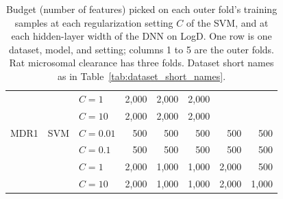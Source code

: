 \begin{table}[htbp]
\begin{tabular}{@{}lllrrrrr@{}}
 &  & $C = 1$ & 2{,}000 & 2{,}000 & 2{,}000 &  &  \\
 &  & $C = 10$ & 2{,}000 & 2{,}000 & 2{,}000 &  &  \\
MDR1 & SVM & $C = 0.01$ & 500 & 500 & 500 & 500 & 500 \\
 &  & $C = 0.1$ & 500 & 500 & 500 & 500 & 500 \\
 &  & $C = 1$ & 2{,}000 & 1{,}000 & 1{,}000 & 2{,}000 & 500 \\
 &  & $C = 10$ & 2{,}000 & 1{,}000 & 1{,}000 & 2{,}000 & 1{,}000 \\
\bottomrule
\end{tabular}
\caption[Budget picked at each setting of the SVM and the DNN.]{Budget (number of features) picked on each outer fold's training samples at each regularization setting $C$ of the SVM, and at each hidden-layer width of the DNN on LogD. One row is one dataset, model, and setting; columns 1 to 5 are the outer folds. Rat microsomal clearance has three folds. Dataset short names as in Table~\ref{tab:dataset_short_names}.}
\label{tab:method:budget_by_capacity}
\end{table}


